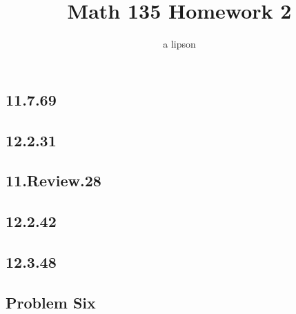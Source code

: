 \documentclass{article}
\title{Math 135 Homework 2}
\author{a lipson}
\begin{document}
\maketitle

\subsection*{11.7.69}


\subsection*{12.2.31}


\subsection*{11.Review.28}


\subsection*{12.2.42}


\subsection*{12.3.48}


\subsection*{Problem Six}

\end{document}
